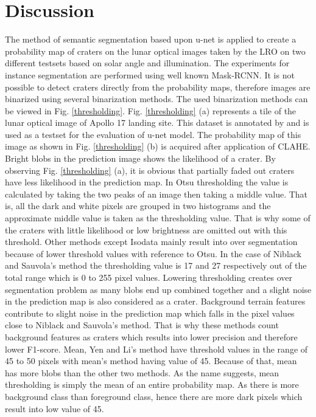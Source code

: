 \documentclass[11pt]{article}
\begin{document}
\section{Discussion}
The method of semantic segmentation based upon u-net is applied to create a probability map of craters on the lunar optical images taken by the LRO on two different testsets based on solar angle and illumination. The experiments for instance segmentation are performed using well known Mask-RCNN. It is not possible to detect craters directly from the probability maps, therefore images are binarized using several binarization methods. The used binarization methods can be viewed in Fig. \ref{thresholding}. Fig. \ref{thresholding} (a) represents a tile of the lunar optical image of Apollo 17 landing site. This dataset is annotated by \cite{dino2020} and is used as a testset for the evaluation of u-net model. The probability map of this image as shown in Fig. \ref{thresholding} (b) is acquired after application of CLAHE. Bright blobs in the prediction image shows the likelihood of a crater. By observing Fig. \ref{thresholding} (a), it is obvious that partially faded out craters have less likelihood in the prediction map. In Otsu thresholding the value is calculated by taking the two peaks of an image then taking a middle value. That is, all the dark and white pixels are grouped in two histograms and the approximate middle value is taken as the thresholding value. That is why some of the craters with little likelihood or low brightness are omitted out with this threshold. Other methods except Isodata mainly result into over segmentation because of lower threshold values with reference to Otsu. In the case of Niblack and Sauvola's method the thresholding value is 17 and 27 respectively out of the total range which is 0 to 255 pixel values. Lowering thresholding creates over segmentation problem as many blobs end up combined together and a slight noise in the prediction map is also considered as a crater. Background terrain features contribute to slight noise in the prediction map which falls in the pixel values close to Niblack and Sauvola's method. That is why these methods count background features as craters which results into lower precision and therefore lower F1-score. Mean, Yen and Li's method have threshold values in the range of 45 to 50 pixels with mean's method having value of 45. Because of that, mean has more blobs than the other two methods. As the name suggests, mean thresholding is simply the mean of an entire probability map. As there is more background class than foreground class, hence there are more dark pixels which result into low value of 45.
\end{document}
